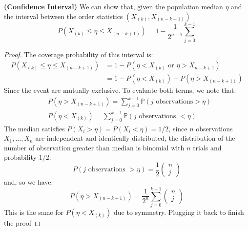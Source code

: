 \begin{proposition}{\textbf{(Confidence Interval)}}
    We can show that, given the population median $\eta$ and the interval between the order statistics $(X_{(k)}, X_{(n-k+1)})$
    \begin{equation*}
        P(X_{(k)} \le \eta \le X_{(n-k+1)}) = 1 - \frac{1}{2^{n-1}}\sum^{k-1}_{j=0}
    \end{equation*}
\end{proposition}
\begin{proof}
    The coverage probability of this interval is:
    \begin{equation*}
    \begin{aligned}
        P(X_{(k)} \le \eta \le X_{(n-k+1)}) &= 1 - P(\eta < X_{(k)} \text{ or } \eta > X_{n-k+1}) \\
        &= 1 - P(\eta < X_{(k)}) - P(\eta > X_{(n-k+1)})
    \end{aligned}
    \end{equation*}
    Since the event are mutually exclusive. To evaluate both terms, we note that:
    \begin{equation*}
    \begin{aligned}
        &P(\eta > X_{(n-k+1)}) = \sum^{k-1}_{j=0} \mathbb{P}(j \text{ observations} > \eta) \\
        &P(\eta < X_{(k)}) = \sum^{k-1}_{j=0} \mathbb{P}(j \text{ observations } < \eta)
    \end{aligned}
    \end{equation*}
    The median satisfies $P(X_i > \eta ) = P(X_i < \eta) = 1/2$, since $n$ observations $X_1,\dots,X_n$ are independent and identically distributed, the distribution of the number of observation greater than median is binomial with $n$ trials and probability $1/2$:
    \begin{equation*}
        P(j \text{ observations } > \eta) = \frac{1}{2}\begin{pmatrix}
            n \\ j
        \end{pmatrix}
    \end{equation*}
    and, so we have:
    \begin{equation*}
        P(\eta > X_{(n-k+1)}) = \frac{1}{2^n}\sum^{k-1}_{j=0}\begin{pmatrix}
            n \\ j
        \end{pmatrix}
    \end{equation*}
    This is the same for $P(\eta < X_{(k)})$ due to symmetry. Plugging it back to finish the proof
\end{proof}

